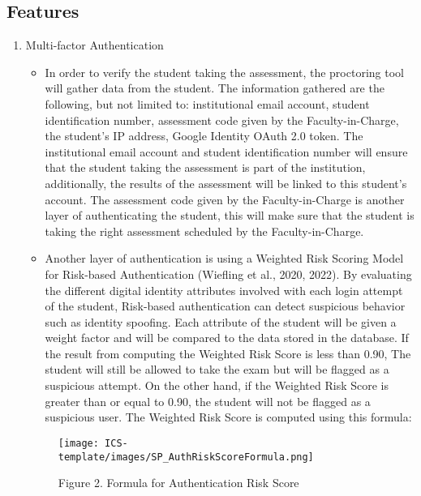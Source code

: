 \documentclass{icsthesis}
\begin{document}
\begin{mainmatter}
\subsection{Features}
    \begin{enumerate}
        \item Multi-factor Authentication
            \begin{itemize}
                \item In order to verify the student taking the assessment, the proctoring tool will gather data from the student. The information gathered are the following, but not limited to: institutional email account, student identification number, assessment code given by the Faculty-in-Charge, the student's IP address, Google Identity OAuth 2.0 token. The institutional email account and student identification number will ensure that the student taking the assessment is part of the institution, additionally, the results of the assessment will be linked to this student's account. The assessment code given by the Faculty-in-Charge is another layer of authenticating the student, this will make sure that the student is taking the right assessment scheduled by the Faculty-in-Charge. \\
                
                \item Another layer of authentication is using a Weighted Risk Scoring Model for Risk-based Authentication (Wiefling et al., 2020, 2022). By evaluating the different digital identity attributes involved with each login attempt of the student, Risk-based authentication can detect suspicious behavior such as identity spoofing. Each attribute of the student will be given a weight factor and will be compared to the data stored in the database. If the result from computing the Weighted Risk Score is less than 0.90, The student will still be allowed to take the exam but will be flagged as a suspicious attempt. On the other hand, if the Weighted Risk Score is greater than or equal to 0.90, the student will not be flagged as a suspicious user. The Weighted Risk Score is computed using this formula:
                \end{itemize}
                \begin{figure}[h]
                \centering
                \texttt{[image: ICS-template/images/SP\_AuthRiskScoreFormula.png]}
                \newline
                \captionsetup{labelformat=empty}
                \caption{Figure 2. Formula for Authentication Risk Score}
                \label{Figure 2: Formula for Authentication Risk Score}
                \end{figure}


\end{enumerate}
\end{mainmatter}
\end{document}
